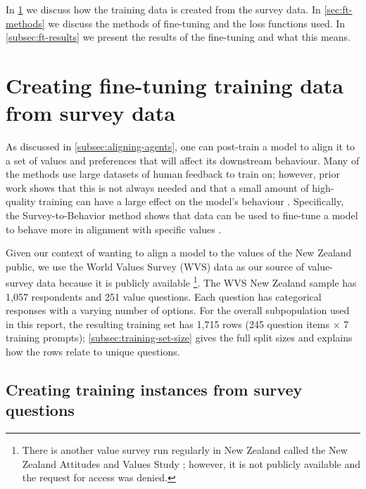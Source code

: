 In \ref{sec:ft-dataset} we discuss how the training data is created from the survey data. In \ref{sec:ft-methods} we discuss the methods of fine-tuning and the loss functions used. In \ref{subsec:ft-results} we present the results of the fine-tuning and what this means.


\section{Creating fine-tuning training data from survey data}
\label{sec:ft-dataset}

As discussed in \ref{subsec:aligning-agents}, one can post-train a model to align it to a set of values and preferences that will affect its downstream behaviour. Many of the methods use large datasets of human feedback to train on; however, prior work shows that this is not always needed and that a small amount of high-quality training can have a large effect on the model's behaviour \cite{zhouLIMALessMore2023,dettmersQLoRAEfficientFinetuning2023}. Specifically, the Survey-to-Behavior method shows that  data can be used to fine-tune a model to behave more in alignment with specific values \cite{nieSurveytoBehaviorDownstreamAlignment2025}.

Given our context of wanting to align a model to the values of the New Zealand public, we use the World Values Survey (WVS) data \cite{WVS2020} as our source of value-survey data because it is publicly available \footnote{There is another value survey run regularly in New Zealand called the New Zealand Attitudes and Values Study \cite{NZAVS2025}; however, it is not publicly available and the request for access was denied.}. The WVS New Zealand sample has 1,057 respondents and 251 value questions. Each question has categorical responses with a varying number of options. For the overall subpopulation used in this report, the resulting training set has 1,715 rows (245 question items $\times$ 7 training prompts); \ref{subsec:training-set-size} gives the full split sizes and explains how the rows relate to unique questions.

\subsection{Creating training instances from survey questions}

